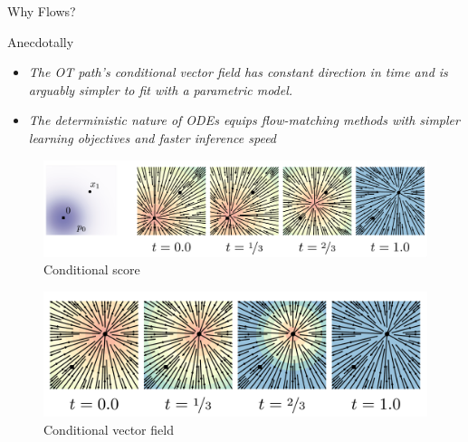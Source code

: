 \documentclass{beamer}
\begin{document}
\begin{frame}{Why Flows?}
    \begin{block}{Anecdotally}
        \begin{itemize}
            \item{\footnotesize \emph{The OT path’s conditional
                vector field has constant direction in time and is arguably simpler to fit with a parametric model. \cite{lipmanFlowMatchingGenerative2023}}}
            \item{\footnotesize \emph{The deterministic
                nature of ODEs equips flow-matching methods with simpler learning objectives and faster inference speed \cite{zhengIntentionConditionedFlowOccupancy2025}}}
        \end{itemize}
    \end{block}
    \vspace*{.5cm}
\begin{figure}
    \hspace*{-.5cm}
    \begin{minipage}{0.50\linewidth}
    \includegraphics[width=1.2\linewidth]{figures/conditional-score.png}
    \hspace*{2.5cm}
    {\footnotesize Conditional score}
    \end{minipage}
    \hspace*{1cm}
    \begin{minipage}{0.39\linewidth}
    \centering
    \includegraphics[width=1.2\linewidth]{figures/conditional-vector-field.png}
    {\footnotesize Conditional vector field}
    \end{minipage}
\end{figure}
\end{frame}
\end{document}
